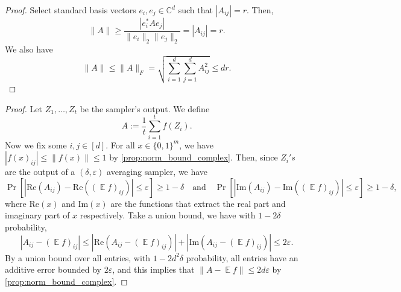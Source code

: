 \documentclass[10pt,a4paper]{article}
\DeclareMathOperator*{\E}{\mathbb{E}}
\newcommand{\eps}{\varepsilon}
\newcommand{\1}{\mathbbm{1}}
\newcommand{\norm}[1]{\left\lVert #1\right\rVert}
\newcommand{\abs}[1]{\left|#1\right| }
\newcommand{\zo}{\{0, 1\}}
\newcommand{\Prb}[2][]{\Pr_{#1}\left[#2\right]}
\begin{document}
\begin{proof}
 Select standard basis vectors \( e_i, e_j \in \mathbb{C}^d \) such that \( |A_{ij}| = r \). Then,
\[
\|A\| \geq \frac{|e_i^* A e_j|}{\|e_i\|_2 \|e_j\|_2} = |A_{ij}| = r.
\]
We also have \[
    \|A\| \le \|A\|_F = \sqrt{\sum_{i = 1}^d \sum_{j = 1}^d A_{ij}^2} \le dr.
\]
\end{proof}


\samplerImpliesMatrxSampler*   

\begin{proof}
    Let $Z_1, \dots, Z_t$ be the sampler's output. We define\[
        A := \frac{1}{t}\sum_{i=1}^t f(Z_i).
    \]  Now we fix some $i,j \in [d]$. For all $x \in \zo^m$, we have $|f(x)_{ij}| \le \norm{f(x)} \le 1$ by \cref{prop:norm_bound_complex}. Then, since $Z_i's$ are the output of a $(\delta, \eps)$ averaging sampler, we have \[
        \Prb{\abs{\mathrm{Re}(A_{ij}) - \mathrm{Re}((\E f)_{ij})} \le \eps} \ge 1 - \delta \quad \text{and} \quad \Prb{\abs{\mathrm{Im}(A_{ij}) - \mathrm{Im}((\E f)_{ij})} \le \eps} \ge 1 - \delta,
    \]
    where $\mathrm{Re}(x)$ and $\mathrm{Im}(x)$ are the functions that extract the real part and imaginary part of $x$ respectively. Take a union bound, we have with $1 - 2\delta$ probability,
    \[
        \abs{A_{ij} - (\E f)_{ij}} \le \abs{\mathrm{Re}(A_{ij} - (\E f)_{ij})} + \abs{\mathrm{Im}(A_{ij} - (\E f)_{ij})} \le 2\eps.
    \]
    By a union bound over all entries, with $1 - 2d^2\delta$ probability, all entries have an additive error bounded by $2\eps$, and this implies that $\|A - \E f\| \le 2d\eps$ by \cref{prop:norm_bound_complex}.
\end{proof}
\end{document}
